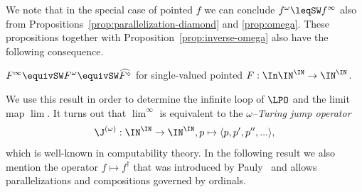 \noindent
We note that in the special case of pointed $f$ we can conclude $f^\omega\leqSW f^\infty$ also
from Propositions~\ref{prop:parallelization-diamond} and \ref{prop:omega}.
These propositions together with Proposition~\ref{prop:inverse-omega} also have the following consequence.

\begin{cor}
\label{cor:single-valued}
$F^\infty\equivSW F^\omega\equivSW\widehat{F^\diamond}$ for single-valued pointed $F:\In\IN^\IN\to\IN^\IN$.
\end{cor}

\noindent
We use this result in order to determine the infinite loop of $\LPO$ and the limit map $\lim$.
It turns out that $\lim^\infty$ is equivalent to the {\em $\omega$--Turing jump operator}
\[\J^{(\omega)}:\IN^\IN\to\IN^\IN,p\mapsto\langle p,p',p'',...\rangle,\]
which is well-known in computability theory.
In the following result we also mention the operator $f\mapsto f^\dagger$ that was introduced by Pauly~\cite{Pau15}
and allows parallelizations and compositions governed by ordinals.

